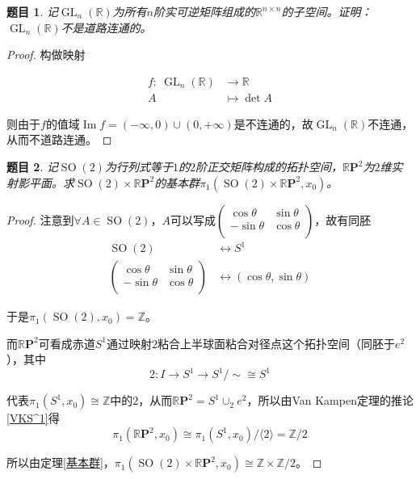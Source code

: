 \documentclass[UTF-8,11pt,fancyhdr,hyperref,titlepage]{ctexart}
\theoremstyle{question}
\newtheorem{timu}{题目}
\theoremstyle{theorem}
\theoremstyle{definition}
\theoremstyle{remark}
\def\RR{{\mathbb R}}
\def\ZZ{{\mathbb Z}}
\def\RP{\mathbb{R}\mathbf{P}}
\def\<{\langle}
\def\>{\rangle}
\def\longto{\longrightarrow}
\def\To{\longto}
\newcommand{\mapdes}[5]
  {
    \begin{align*}
      #1\colon\  #2 & \longrightarrow  #3 \\
            #4 & \longmapsto  #5
    \end{align*}
  }
\DeclareMathOperator{\im}{Im}
\DeclareMathOperator{\GL}{GL}
\DeclareMathOperator{\SO}{SO}
\begin{document}
\begin{timu}\label{7}
  记$\GL_n(\RR)$为所有$n$阶实可逆矩阵组成的$\RR^{n\times n}$的子空间。证明：$\GL_n(\RR)$不是道路连通的。
\end{timu}
\begin{proof}
  构做映射
  \mapdes{f}{\GL_n(\RR)}{\RR}{A}{\det A}
  则由于$f$的值域$\im f=(-\infty,0)\cup(0,+\infty)$是不连通的，故$\GL_n(\RR)$不连通，从而不道路连通。
\end{proof}

\begin{timu}\label{8}
  记$\SO(2)$为行列式等于$1$的$2$阶正交矩阵构成的拓扑空间，$\RP^2$为$2$维实射影平面。求$\SO(2)\times\RP^2$的基本群$\pi_1(\SO(2)\times\RP^2,x_0)$。
\end{timu}
\begin{proof}
  注意到$\forall A\in\SO(2)$，$A$可以写成$\begin{pmatrix}
                                   \cos\theta & \sin\theta \\
                                   -\sin\theta & \cos\theta \\
                                 \end{pmatrix}$，故有同胚
    \begin{align*}
            \SO(2) & \longleftrightarrow  S^1 \\
            \begin{pmatrix}
                \cos\theta & \sin\theta \\
               -\sin\theta & \cos\theta \\
             \end{pmatrix}
             & \longleftrightarrow  (\cos\theta, \sin\theta)
    \end{align*}

    于是$\pi_1(\SO(2),x_0)=\ZZ$。

    而$\RP^2$可看成赤道$S^1$通过映射$2$粘合上半球面粘合对径点这个拓扑空间（同胚于$e^2$），其中
    \begin{equation*}
      2\colon I\To S^1\To S^1/\sim\cong S^1
    \end{equation*}
    
    代表$\pi_1(S^1,x_0)\cong\ZZ$中的$2$，从而$\RP^2=S^1\cup_2e^2$，所以由Van Kampen定理的推论\ref{VKS^1}得
    \begin{equation*}
    \pi_1(\RP^2,x_0)\cong\pi_1(S^1,x_0)/\<2\>=\ZZ/2
    \end{equation*}

    所以由定理\ref{基本群}，$\pi_1(\SO(2)\times\RP^2,x_0)\cong\ZZ\times\ZZ/2$。
\end{proof}
\end{document}
